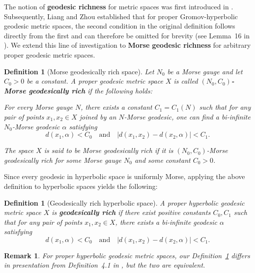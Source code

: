 \documentclass[a4paper,11pt,oneside]{article}
\newtheorem{Definition}[Theorem]{Definition}
\newtheorem{Lemma}[Theorem]{Lemma}
\newtheorem{Remark}[Theorem]{Remark}
\begin{document}
The notion of \textbf{geodesic richness} for metric spaces was first introduced in \cite{Shchur13}. Subsequently, Liang and Zhou \cite{LiangZhou24} established that for proper Gromov-hyperbolic geodesic metric spaces, the second condition in the original definition follows directly from the first and can therefore be omitted for brevity (see Lemma~16 in \cite{LiangZhou24}). We extend this line of investigation to \textbf{Morse geodesic richness} for arbitrary proper geodesic metric spaces.


\begin{Definition}[Morse geodesically rich space] \label{Def:GeoRich}
Let $N_0$ be a Morse gauge and let $C_0>0$ be a constant. 
A proper geodesic metric space $X$ is called \textbf{$(N_0, C_0)$-Morse geodesically rich} if the following holds:

For every Morse gauge $N$, there exists a constant $C_1 = C_1(N)$ such that for any pair of points $x_1, x_2 \in X$ joined by an $N$-Morse geodesic, one can find a bi-infinite $N_0$-Morse geodesic $\alpha$ satisfying
  \[d(x_1, \alpha)<C_0\quad\mbox {and}\quad
  \left|d(x_1,x_2)-d(x_2,\alpha)\right|<C_1.\]

  The space $X$ is said to be Morse geodesically rich if it is $(N_0, C_0)$-Morse geodesically rich for some Morse gauge $N_0$ and some constant $C_0>0$.
\end{Definition}

Since every geodesic in hyperbolic space is uniformly Morse, applying the above definition to hyperbolic spaces yields the following:

\begin{Definition}[Geodesically rich hyperbolic space] \label{hyGR}
A proper hyperbolic geodesic metric space $X$ is \textbf{geodesically rich} if there exist positive constants $C_0, C_1$ such that
for any pair of points $x_1, x_2\in X$, there exists a bi-infinite geodesic $\alpha$ satisfying
  \[d(x_1, \alpha)<C_0\quad\mbox{and}\quad\left|d(x_1,x_2)-d(x_2,\alpha)\right|<C_1.\]
\end{Definition}

\begin{Remark}
  For proper hyperbolic geodesic metric spaces, our Definition~\ref{hyGR} differs in presentation from Definition~4.1 in \cite{LiangZhou24}, but the two are equivalent.
\end{Remark}



\end{document}
